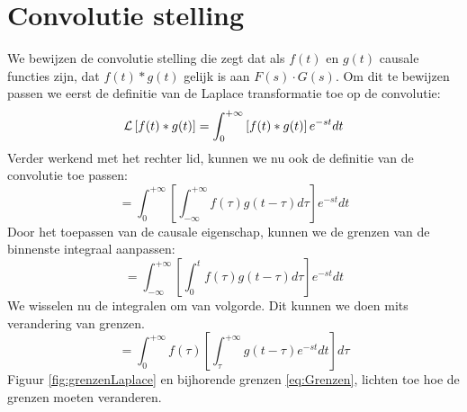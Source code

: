 \documentclass[]{subfiles}
\begin{document}
	\section{Convolutie stelling}
	We bewijzen de convolutie stelling die zegt dat als $f(t)$ en $g(t)$ causale functies zijn, dat $f(t)\ast g(t)$ gelijk is aan $F(s)\cdot G(s)$. Om dit te bewijzen passen we eerst de definitie van de Laplace transformatie toe op de convolutie:
	\begin{equation}
		\mathcal{L}\left[ f(t)\ast g(t)\right]  = \int_{0}^{+\infty}\left[ f(t)\ast g(t)\right] e^{-st}dt
	\end{equation}
	Verder werkend met het rechter lid, kunnen we nu ook de definitie van de convolutie toe passen:
	\begin{equation}
		=\int_{0}^{+\infty}\left[ \int_{-\infty}^{+\infty}f(\tau)g(t-\tau)d\tau	\right] e^{-st}dt
	\end{equation}
	Door het toepassen van de causale eigenschap, kunnen we de grenzen van de binnenste integraal aanpassen: 
	\begin{equation}
		=\int_{-\infty}^{+\infty}\left[ \int_{0}^{t}f(\tau)g(t-\tau)d\tau\right] e^{-st}dt
	\end{equation}
	We wisselen nu de integralen om van volgorde. Dit kunnen we doen mits verandering van grenzen. 
	\begin{equation}
		=\int_{0}^{+\infty}f(\tau)\left[ \int_{\tau}^{+\infty}g(t-\tau)e^{-st}dt\right] d\tau
	\end{equation}
	Figuur \ref{fig:grenzenLaplace} en bijhorende grenzen \ref{eq:Grenzen}, lichten toe hoe de grenzen moeten veranderen.
\end{document}
